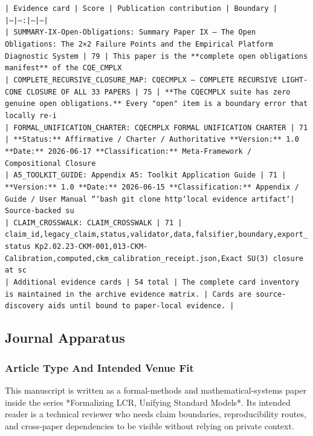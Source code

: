 \documentclass[11pt]{article}
\begin{document}
\noindent\texttt{| Evidence card | Score | Publication contribution | Boundary |}\\
\noindent\texttt{|---|---:|---|---|}\\
\noindent\texttt{| SUMMARY-IX-Open-Obligations: Summary Paper IX — The Open Obligations: The 2×2 Failure Points and the Empirical Platform Diagnostic System | 79 | This paper is the **complete open obligations manifest** of the CQE\_CMPLX}\\
\noindent\texttt{| COMPLETE\_RECURSIVE\_CLOSURE\_MAP: CQECMPLX — COMPLETE RECURSIVE LIGHT-CONE CLOSURE OF ALL 33 PAPERS | 75 | **The CQECMPLX suite has zero genuine open obligations.** Every "open" item is a boundary error that locally re-i}\\
\noindent\texttt{| FORMAL\_UNIFICATION\_CHARTER: CQECMPLX FORMAL UNIFICATION CHARTER | 71 | **Status:** Affirmative / Charter / Authoritative **Version:** 1.0 **Date:** 2026-06-17 **Classification:** Meta-Framework / Compositional Closure }\\
\noindent\texttt{| A5\_TOOLKIT\_GUIDE: Appendix A5: Toolkit Application Guide | 71 | **Version:** 1.0 **Date:** 2026-06-15 **Classification:** Appendix / Guide / User Manual ```bash git clone http`local evidence artifact`| Source-backed su}\\
\noindent\texttt{| CLAIM\_CROSSWALK: CLAIM\_CROSSWALK | 71 | claim\_id,legacy\_claim,status,validator,data,falsifier,boundary,export\_status Kp2.02.23-CKM-001,013-CKM-Calibration,computed,ckm\_calibration\_receipt.json,Exact SU(3) closure at sc}\\
\noindent\texttt{| Additional evidence cards | 54 total | The complete card inventory is maintained in the archive evidence matrix. | Cards are source-discovery aids until bound to paper-local evidence. |}\\

\subsection*{Journal Apparatus}

\subsubsection*{Article Type And Intended Venue Fit}

This manuscript is written as a formal-methods and mathematical-systems paper
inside the series *Formalizing LCR, Unifying Standard Models*. Its intended
reader is a technical reviewer who needs claim boundaries, reproducibility
routes, and cross-paper dependencies to be visible without relying on private
context.
\end{document}
